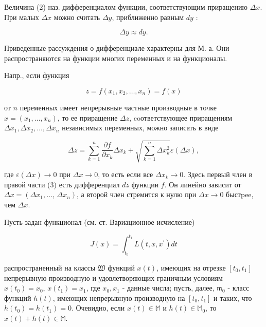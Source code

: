 \documentclass[10pt]{article}
\begin{document}
Величина (2) наз. дифференциалом функции, соответствующим приращению $\Delta x$. При малых $\Delta x$ можно считать $\Delta y$, приближенно равным $d y$ :



\[

\Delta y \approx d y .

\]



Приведенные рассуждения о дифференциале характерны для М. а. Они распространяются на функции многих переменных и на функционалы.



Напр., если функция



\[

z=f\left(x_{1}, x_{2}, \ldots, x_{n}\right)=f(x)

\]



от $n$ переменных имеет непрерывные частные производные в точке $x=\left(x_{1}, \ldots, x_{n}\right)$, то ее приращение $\Delta z$, coответствующее приращениям $\Delta x_{1}, \Delta x_{2}, \ldots, \Delta x_{n}$ независимых переменных, можно записать в виде



\[

\Delta z=\sum_{k=1}^{n} \frac{\partial f}{\partial x_{k}} \Delta x_{k}+\sqrt{\sum_{k=1}^{n} \Delta x_{k}^{2}} \varepsilon(\Delta x),

\]



где $\varepsilon(\Delta x) \rightarrow 0$ при $\Delta x \rightarrow 0$, то есть если все $\Delta x_{k} \rightarrow 0$. Здесь первый член в правой части (3) есть дифференциал $d z$ функции $f$. Он линейно зависит от $\Delta x=\left(\Delta x_{1}, \ldots\right.$, $\left.\Delta x_{n}\right)$, а второй член стремится к нулю при $\Delta x \rightarrow 0$ быстpee, чем $\Delta x$.



Пусть задан функционал (см. ст. Вариационное исчисление)



\[

J(x)=\int_{t_{0}}^{t_{1}} L\left(t, x, x^{\prime}\right) d t

\]



распространенный на классы $\mathfrak{W}$ функций $x(t)$, имеющих на отрезке $\left[t_{0}, t_{1}\right]$ непрерывную производную и удовлетворяющих граничным условиям $x\left(t_{0}\right)=x_{0}$, $x\left(t_{1}\right)=x_{1}$, где $x_{0}, x_{1}$ - данные числа; пусть, далее, $\mathfrak{m}_{0}$ - класс функций $h(t)$, имеющих непрерывную производную на $\left[t_{0}, t_{1}\right]$ и таких, что $h\left(t_{0}\right)=h\left(t_{1}\right)=0$. Очевидно, если $x(t) \in \mathbb{M}$ и $h(t) \in \mathbb{M}_{0}$, то $x(t)+h(t) \in \mathbb{M}$.
\end{document}
